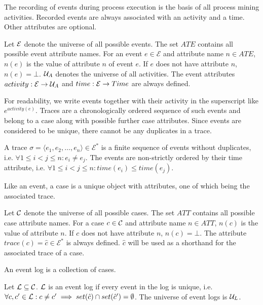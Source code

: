 The recording of events during process execution is the basis of all process mining activities. Recorded events are always associated with an activity and a time. Other attributes are optional.
\begin{definition}[Event]
Let $\mathcal{E}$ denote the universe of all possible events. The set $ATE$ contains all possible event attribute names. For an event $e \in \mathcal{E}$ and attribute name $n\in ATE$, $n(e)$ is the value of attribute $n$ of event $e$. If $e$ does not have attribute $n$, $n(e)=\bot$. $\mathcal{U}_A$ denotes the universe of all activities. The event attributes $activity:\mathcal{E}\to \mathcal{U}_A$ and $time: \mathcal{E} \to Time$ are always defined.
\end{definition}
For readability, we write events together with their activity in the superscript like $e^{activity(e)}$.
Traces are a chronologically ordered sequence of such events and belong to a case along with possible further case attributes. Since events are considered to be unique, there cannot be any duplicates in a trace.
\begin{definition}[Trace]
A trace $\sigma = \langle e_1, e_2, \ldots, e_n \rangle \in \mathcal{E}^*$ is a finite sequence of events without duplicates, i.e. $\forall 1\le i < j\le n: e_i \neq e_j$. The events are non-strictly ordered by their time attribute, i.e. $\forall 1\le i < j\le n: time(e_i) \le time(e_j) $.
\end{definition}
Like an event, a case is a unique object with attributes, one of which being the associated trace.
\begin{definition}[Case]
Let $\mathcal{C}$ denote the universe of all possible cases. The set $ATT$ contains all possible case attribute names. For a case $c\in \mathcal{C}$ and attribute name $n \in ATT$, $n(c)$ is the value of attribute $n$. If $c$ does not have attribute $n$, $n(c) = \bot$. The attribute $trace(c)=\hat{c}\in \mathcal{E}^*$ is always defined. $\hat{c}$ will be used as a shorthand for the associated trace of a case.
\end{definition}
An event log is a collection of cases.
\begin{definition}
Let $\mathcal{L} \subseteq \mathcal{C}$. $\mathcal{L}$ is an event log if every event in the log is unique, i.e. $\forall c,c^\prime \in \mathcal{L}: c\neq c^\prime \implies set(\hat{c}) \cap set(\hat{c}^\prime) = \emptyset$. The universe of event logs is $\mathcal{U}_L$.
\end{definition}

